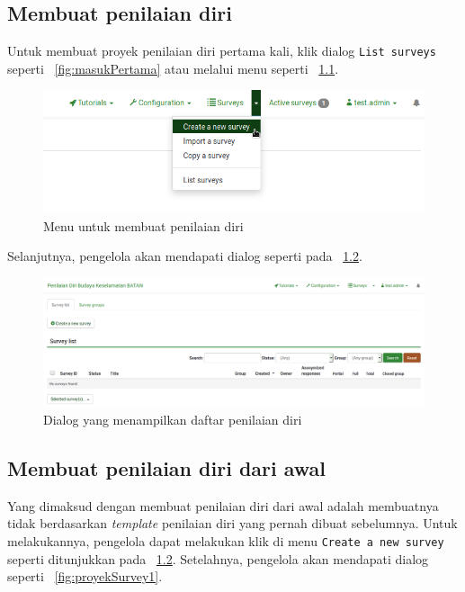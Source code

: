 \chapter{\babDua}
\section{Membuat penilaian diri}
Untuk membuat proyek penilaian diri pertama kali, klik dialog \texttt{List surveys} seperti \figurename~\ref{fig:masukPertama} atau melalui menu seperti \figurename~\ref{fig:createSurvey}.
\begin{figure}
  \begin{center}
    \includegraphics[scale=.45]{pics/createSurvey.png}
    \caption{Menu untuk membuat penilaian diri}
    \label{fig:createSurvey}
  \end{center}
\end{figure}

Selanjutnya, pengelola akan mendapati dialog seperti pada \figurename~\ref{fig:proyekSurvey}.
\begin{figure}
  \begin{center}
    \includegraphics[scale=.35]{pics/proyekSurvey.png}
    \caption{Dialog yang menampilkan daftar penilaian diri}
    \label{fig:proyekSurvey}
  \end{center}
\end{figure}

\section{Membuat penilaian diri dari awal}
Yang dimaksud dengan membuat penilaian diri dari awal adalah membuatnya tidak berdasarkan \textit{template} penilaian diri yang pernah dibuat sebelumnya. Untuk melakukannya, pengelola dapat melakukan klik di menu \texttt{Create a new survey} seperti ditunjukkan pada \figurename~\ref{fig:proyekSurvey}. Setelahnya, pengelola akan mendapati dialog seperti \figurename~\ref{fig:proyekSurvey1}.

